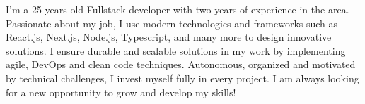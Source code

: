 
\begin{cvparagraph}
    I'm a 25 years old Fullstack developer with two years of experience in the area. Passionate about my job, I use modern technologies and frameworks such as React.js, Next.js, Node.js, Typescript, and many more to design innovative solutions. I ensure durable and scalable solutions in my work by implementing agile, DevOps and clean code techniques. Autonomous, organized and motivated by technical challenges, I invest myself fully in every project.
    I am always looking for a new opportunity to grow and develop my skills!
\end{cvparagraph}
